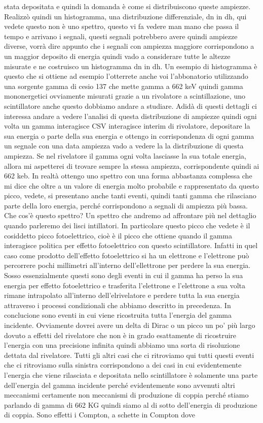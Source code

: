 stata depositata e quindi la domanda è come si distribuiscono queste ampiezze. Realizzò quindi un histogramma, una distribuzione differenziale, dn in dh, qui vedete questo non è uno spettro, questo vi fa vedere man mano che passa il tempo e arrivano i segnali, questi segnali potrebbero avere quindi ampiezze diverse, vorrà dire appunto che i segnali con ampiezza maggiore corrispondono a un maggior deposito di energia quindi vado a considerare tutte le altezze misurate e ne costruisco un histogramma dn in dh. Un esempio di histogramma è questo che si ottiene ad esempio l'otterrete anche voi l'abbonatorio utilizzando una sorgente gamma di cesio 137 che mette gamma a 662 keV quindi gamma mononergetici ovviamente misurati grazie a un rivolatore a scintillazione, uno scintillatore anche questo dobbiamo andare a studiare. Adidà di questi dettagli ci interessa andare a vedere l'analisi di questa distribuzione di ampiezze quindi ogni volta un gamma interagisce CSV interagisce interim di rivolatore, depositare la sua energia o parte della sua energia e ottengo in corrispondenza di ogni gamma un segnale con una data ampiezza vado a vedere la la distribuzione di questa ampiezza. Se nel rivelatore il gamma ogni volta lasciasse la sua totale energia, allora mi aspetterei di trovare sempre la stessa ampiezza, corrispondente quindi ai 662 keb. In realtà ottengo uno spettro con una forma abbastanza complessa che mi dice che oltre a un valore di energia molto probabile e rappresentato da questo picco, vedete, si presentano anche tanti eventi, quindi tanti gamma che rilasciano parte della loro energia, perché corrispondono a segnali di ampiezza più bassa. Che cos'è questo spettro? Un spettro che andremo ad affrontare più nel dettaglio quando parleremo dei lisci intillatori. In particolare questo picco che vedete è il cosiddetto picco fotoelettrico, cioè è il picco che ottiene quando il gamma interagisce politica per effetto fotoelettrico con questo scintillatore. Infatti in quel caso come prodotto dell'effetto fotoelettrico si ha un elettrone e l'elettrone può percorrere pochi millimetri all'interno dell'ellettrone per perdere la sua energia. Sosso essenzialmente questi sono degli eventi in cui il gamma ha perso la sua energia per effetto fotoelettrico e trasferita l'elettrone e l'elettrone a sua volta rimane intrapolato all'interno dell'elrivelatore e perdere tutta la sua energia attraverso i processi condizionali che abbiamo descritto in precedenza. In conclucione sono eventi in cui viene ricostruita tutta l'energia del gamma incidente. Ovviamente dovrei avere un delta di Dirac o un picco un po' più largo dovuto a effetti del rivelatore che non è in grado esattamente di ricostruire l'energia con una precisione infinita quindi abbiamo una sorta di risoluzione dettata dal rivelatore. Tutti gli altri casi che ci ritroviamo qui tutti questi eventi che ci ritroviamo sulla sinistra corrispondono a dei casi in cui evidentemente l'energia che viene rilasciata e depositata nello scintillatore è solamente una parte dell'energia del gamma incidente perché evidentemente sono avvenuti altri meccanismi certamente non meccanismi di produzione di coppia perché stiamo parlando di gamma di 662 KG quindi siamo al di sotto dell'energia di produzione di coppia. Sono effetti i Compton, a schette in Compton dove 